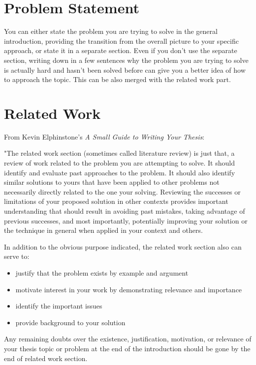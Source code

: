 \documentclass[a4paper,twoside, openright,12pt]{report}
\begin{document}
\section{Problem Statement}

You can either state the problem you are trying to solve in the general introduction, providing the transition from the overall picture to your specific approach, or state it in a separate section. Even if you don't use the separate section, writing down in a few sentences why the problem you are trying to solve is actually hard and hasn't been solved before can give you a better idea of how to approach the topic. This can be also merged with the related work part.

\section{Related Work}

From Kevin Elphinstone's \emph{A Small Guide to Writing Your Thesis}\cite{Elphinstone2014}:

"The related work section (sometimes called literature review) is just that, a review of work related to the problem you are attempting to solve. It should identify and evaluate past approaches to the problem. It should also identify similar solutions to yours that have been applied to other problems not necessarily directly related to the one your solving. Reviewing the successes or limitations of your proposed solution in other contexts provides important understanding that should result in avoiding past mistakes, taking advantage of previous successes, and most importantly, potentially improving your solution or the technique in general when applied in your context and others.

In addition to the obvious purpose indicated, the related work section also can serve to:

\begin{itemize}
	\item justify that the problem exists by example and argument
	\item motivate interest in your work by demonstrating relevance and importance
	\item identify the important issues
	\item provide background to your solution
\end{itemize}

Any remaining doubts over the existence, justification, motivation, or relevance of your thesis topic or problem at the end of the introduction should be gone by the end of related work section.
\end{document}
